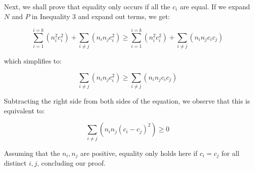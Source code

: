 \begin{enumerate}[label=(\alph*)]
Next, we shall prove that equality only occurs if all the \(c_{i}\) are equal. If we expand \(N\) and \(P\) in Inequality 3 and expand out terms, we get:

\[\sum\limits_{i=1}^{i=k}(n_{i}^{2}c_{i}^{2}) + \sum\limits_{i\neq j}(n_{i}n_{j}c_{i}^{2}) \geq \sum\limits_{i=1}^{i=k}(n_{i}^{2}c_{i}^{2}) + \sum\limits_{i\neq j}(n_{i}n_{j}c_{i}c_{j})\]

which simplifies to:

\[\sum\limits_{i\neq j}(n_{i}n_{j}c_{i}^{2}) \geq \sum\limits_{i\neq j}(n_{i}n_{j}c_{i}c_{j})\]

Subtracting the right side from both sides of the equation, we observe that this is equivalent to:

\[\sum\limits_{i\neq j}(n_{i}n_{j}(c_{i}-c_{j})^{2}) \geq 0\]

Assuming that the \(n_{i},n_{j}\) are positive, equality only holds here if \(c_{i}=c_{j}\) for all distinct \(i,j\), concluding our proof. 

\end{enumerate}
